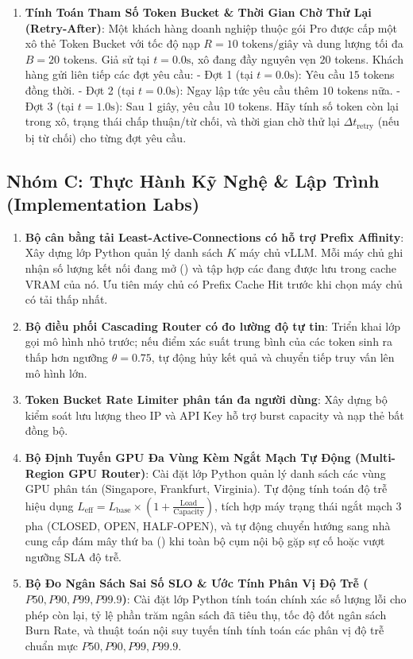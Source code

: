\begin{enumerate}[label=\textbf{B\arabic*.}]
  \item \textbf{Tính Toán Tham Số Token Bucket \& Thời Gian Chờ Thử Lại (Retry-After)}:
  Một khách hàng doanh nghiệp thuộc gói Pro được cấp một xô thẻ Token Bucket với tốc độ nạp $R = 10\text{ tokens/giây}$ và dung lượng tối đa $B = 20\text{ tokens}$.
  Giả sử tại $t = 0.0\text{s}$, xô đang đầy nguyên vẹn $20$ tokens. Khách hàng gửi liên tiếp các đợt yêu cầu:
  - Đợt 1 (tại $t = 0.0\text{s}$): Yêu cầu $15$ tokens đồng thời.
  - Đợt 2 (tại $t = 0.0\text{s}$): Ngay lập tức yêu cầu thêm $10$ tokens nữa.
  - Đợt 3 (tại $t = 1.0\text{s}$): Sau 1 giây, yêu cầu $10$ tokens.
  Hãy tính số token còn lại trong xô, trạng thái chấp thuận/từ chối, và thời gian chờ thử lại $\Delta t_{\text{retry}}$ (nếu bị từ chối) cho từng đợt yêu cầu.
\end{enumerate}

\subsection{Nhóm C: Thực Hành Kỹ Nghệ \& Lập Trình (Implementation Labs)}

\begin{enumerate}[label=\textbf{C\arabic*.}]
  \item \textbf{Bộ cân bằng tải Least-Active-Connections có hỗ trợ Prefix Affinity}:
  Xây dựng lớp Python  quản lý danh sách $K$ máy chủ vLLM. Mỗi máy chủ ghi nhận số lượng kết nối đang mở () và tập hợp các  đang được lưu trong cache VRAM của nó. Ưu tiên máy chủ có Prefix Cache Hit trước khi chọn máy chủ có tải thấp nhất.
  \item \textbf{Bộ điều phối Cascading Router có đo lường độ tự tin}:
  Triển khai lớp  gọi mô hình nhỏ trước; nếu điểm xác suất trung bình của các token sinh ra thấp hơn ngưỡng $\theta = 0.75$, tự động hủy kết quả và chuyển tiếp truy vấn lên mô hình lớn.
  \item \textbf{Token Bucket Rate Limiter phân tán đa người dùng}:
  Xây dựng bộ kiểm soát lưu lượng theo IP và API Key hỗ trợ burst capacity và nạp thẻ bất đồng bộ.
  \item \textbf{Bộ Định Tuyến GPU Đa Vùng Kèm Ngắt Mạch Tự Động (Multi-Region GPU Router)}:
  Cài đặt lớp Python  quản lý danh sách các vùng GPU phân tán (Singapore, Frankfurt, Virginia). Tự động tính toán độ trễ hiệu dụng $L_{\text{eff}} = L_{\text{base}} \times (1 + \frac{\text{Load}}{\text{Capacity}})$, tích hợp máy trạng thái ngắt mạch 3 pha (CLOSED, OPEN, HALF-OPEN), và tự động chuyển hướng sang nhà cung cấp đám mây thứ ba () khi toàn bộ cụm nội bộ gặp sự cố hoặc vượt ngưỡng SLA độ trễ.
  \item \textbf{Bộ Đo Ngân Sách Sai Số SLO \& Ước Tính Phân Vị Độ Trễ ($P50, P90, P99, P99.9$)}:
  Cài đặt lớp Python  tính toán chính xác số lượng lỗi cho phép còn lại, tỷ lệ phần trăm ngân sách đã tiêu thụ, tốc độ đốt ngân sách Burn Rate, và thuật toán nội suy tuyến tính tính toán các phân vị độ trễ chuẩn mực $P50, P90, P99, P99.9$.
\end{enumerate}

